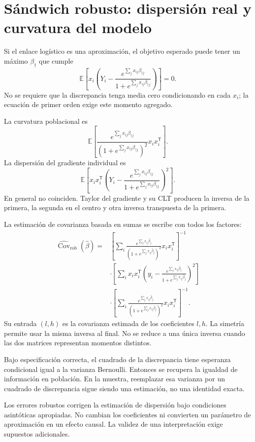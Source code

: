 \documentclass[11pt,a4paper]{article}
\newcommand{\E}{\mathbb E}
\newcommand{\T}{^{\mathsf T}}
\DeclareMathOperator{\Cov}{Cov}
\begin{document}
\clearpage
\section{Sándwich robusto: dispersión real y curvatura del modelo}\label{logit57}
Si el enlace logístico es una aproximación, el objetivo esperado
puede tener un máximo $\beta_\dagger$ que cumple
\[
\E\!\left[x_i\left(
Y_i-\frac{e^{\sum_jx_{ij}\beta_{\dagger j}}}
{1+e^{\sum_jx_{ij}\beta_{\dagger j}}}\right)\right]=0.
\]
No se requiere que la discrepancia tenga media cero
condicionando en cada $x_i$; la ecuación de primer orden
exige este momento agregado.

La curvatura poblacional es
\[
\E\!\left[
\frac{e^{\sum_jx_{ij}\beta_{\dagger j}}}
{(1+e^{\sum_jx_{ij}\beta_{\dagger j}})^2}x_ix_i\T
\right].
\]
La dispersión del gradiente individual es
\[
\E\!\left[
x_ix_i\T
\left(Y_i-\frac{e^{\sum_jx_{ij}\beta_{\dagger j}}}
{1+e^{\sum_jx_{ij}\beta_{\dagger j}}}\right)^2
\right].
\]
En general no coinciden. Taylor del gradiente y su CLT
producen la inversa de la primera, la segunda en el centro
y otra inversa transpuesta de la primera.

La estimación de covarianza basada en sumas se escribe
con todos los factores:
\[
\begin{aligned}
\widehat{\Cov}_{\mathrm{rob}}(\widehat\beta)
={}&\left[
\sum_i\frac{e^{\sum_jx_{ij}\widehat\beta_j}}
{(1+e^{\sum_jx_{ij}\widehat\beta_j})^2}x_ix_i\T
\right]^{-1}\\
&\cdot\left[
\sum_i x_ix_i\T
\left(y_i-\frac{e^{\sum_jx_{ij}\widehat\beta_j}}
{1+e^{\sum_jx_{ij}\widehat\beta_j}}\right)^2
\right]\\
&\cdot\left[
\sum_i\frac{e^{\sum_jx_{ij}\widehat\beta_j}}
{(1+e^{\sum_jx_{ij}\widehat\beta_j})^2}x_ix_i\T
\right]^{-1}.
\end{aligned}
\]
Su entrada $(l,h)$ es la covarianza estimada de los
coeficientes $l,h$.
La simetría permite usar la misma inversa al final.
No se reduce a una única inversa cuando las dos matrices
representan momentos distintos.

Bajo especificación correcta, el cuadrado de la discrepancia
tiene esperanza condicional igual a la varianza Bernoulli.
Entonces se recupera la igualdad de información en población.
En la muestra, reemplazar esa varianza por un cuadrado de
discrepancia sigue siendo una estimación, no una identidad exacta.

Los errores robustos corrigen la estimación de dispersión
bajo condiciones asintóticas apropiadas.
No cambian los coeficientes ni convierten un parámetro
de aproximación en un efecto causal.
La validez de una interpretación exige supuestos adicionales.
\end{document}
